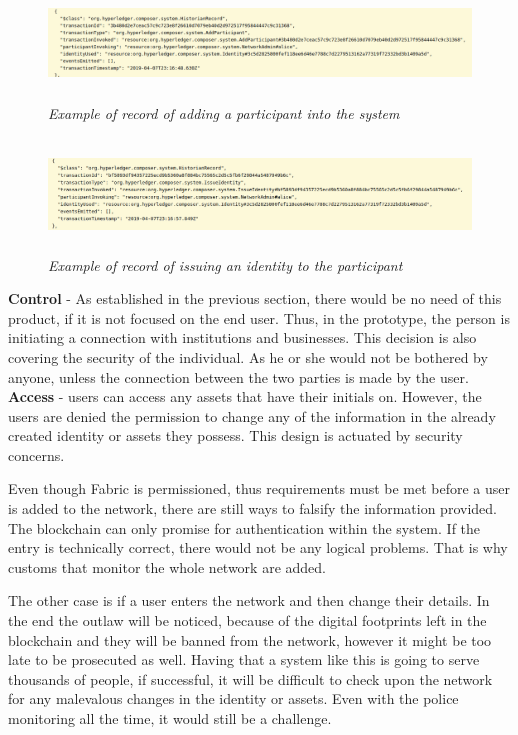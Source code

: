 \documentclass[a4paper,11pt]{report}
\begin{document}
\begin{figure}[h]
\centering
  \includegraphics[height = 3cm ,width = 16cm]{addParticipantREST.png}
  \caption{\textit{Example of record of adding a participant into the system}}
  \label{addParticipantREST}
\end{figure}

\begin{figure}[h]
\centering
  \includegraphics[height = 3cm ,width = 16cm]{issueIdentityREST.png}
  \caption{\textit{Example of record of issuing an identity to the participant}}
  \label{issueIdentityREST}
\end{figure}

\textbf{Control} - As established in the previous section, there would be no need of this product, if it is not focused on the end user. Thus, in the prototype, the person is initiating a connection with institutions and businesses. This decision is also covering the security of the individual. As he or she would not be bothered by anyone, unless the connection between the two parties is made by the user.  
\\

	\textbf{Access} - users can access any assets that have their initials on. However, the users are denied the permission to change any of the information in the already created identity or assets they possess. This design is actuated by security concerns. 
	
Even though Fabric is permissioned, thus requirements must be met before a user is added to the network, there are still ways to falsify the information provided. The blockchain can only promise for authentication within the system. If the entry is technically correct, there would not be any logical problems. That is why customs that monitor the whole network are added.  

The other case is if a user enters the network and then change their details. In the end the outlaw will be noticed, because of the digital footprints left in the blockchain and they will be banned from the network, however it might be too late to be prosecuted as well. Having that a system like this is going to serve thousands of people, if successful, it will be difficult to check upon the network for any malevalous changes in the identity or assets. Even with the police monitoring all the time, it would still be a challenge. 
\\
\end{document}
